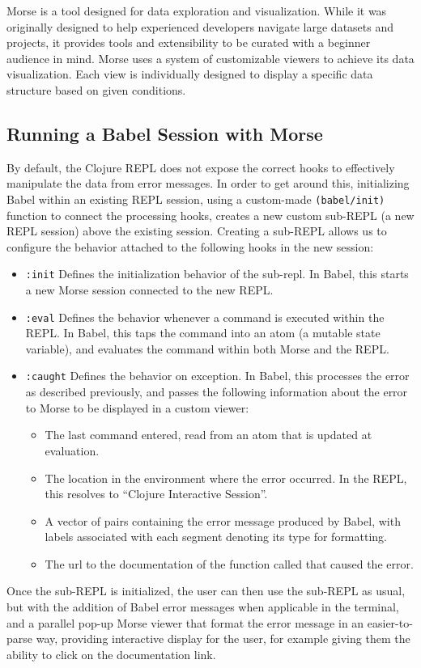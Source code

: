 \documentclass[12pt]{article}
\begin{document}
Morse is a tool designed for data exploration and visualization.
While it was originally designed to help experienced developers navigate large datasets and projects, 
it provides tools and extensibility to be curated with a beginner audience in mind.
Morse uses a system of customizable viewers to achieve its data visualization.
Each view is individually designed to display a specific data structure based on given conditions.

\subsection{Running a Babel Session with Morse}\label{subsec:babel-w-morse}

By default, the Clojure REPL does not expose the correct hooks to effectively manipulate the data from error messages.
In order to get around this, initializing Babel within an existing REPL session, using a custom-made \texttt{(babel/init)} function to connect the processing hooks, creates a new custom sub-REPL (a new REPL session) above the existing session.
Creating a sub-REPL allows us to configure the behavior attached to the following hooks in the new session:
\begin{itemize}
	\item \texttt{:init} Defines the initialization behavior of the sub-repl. 
		In Babel, this starts a new Morse session connected to the new REPL.
	\item \texttt{:eval} Defines the behavior whenever a command is executed within the REPL. 
		In Babel, this taps the command into an atom (a mutable state variable), and evaluates the command within both Morse and the REPL.
	\item \texttt{:caught} Defines the behavior on exception.
		In Babel, this processes the error as described previously, 
			and passes the following information about the error to Morse to be displayed in a custom viewer:
			\begin{itemize}
				\item The last command entered, read from an atom that is updated at evaluation.
				\item The location in the environment where the error occurred. In the REPL, this resolves to ``Clojure Interactive Session''.
				\item A vector of pairs containing the error message produced by Babel, with labels associated with each segment denoting its type for formatting.
				\item The url to the documentation of the function called that caused the error. 
			\end{itemize}
\end{itemize}
Once the sub-REPL is initialized, the user can then use the sub-REPL as usual, but with the addition of Babel error messages when applicable in the terminal, and a parallel pop-up Morse viewer that format the error message in an easier-to-parse way, providing interactive display for the user, for example giving them the ability to click on the documentation link. 
\end{document}
